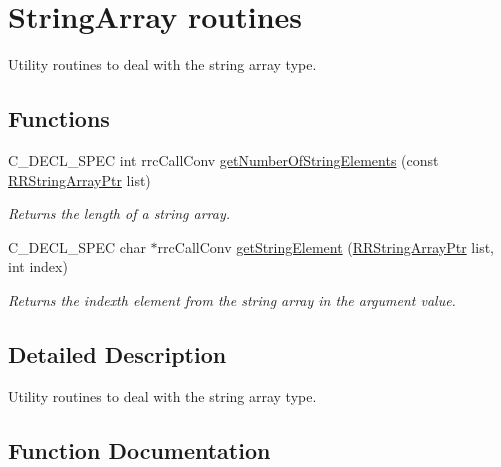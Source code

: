 \hypertarget{group__string_array}{}\section{String\+Array routines}
\label{group__string_array}


Utility routines to deal with the string array type.  


\subsection*{Functions}
\begin{DoxyCompactItemize}
\item 
C\+\_\+\+D\+E\+C\+L\+\_\+\+S\+P\+E\+C int rrc\+Call\+Conv \hyperlink{group__string_array_ga4fcdcd7af4041c61ad958b7444ed0263}{get\+Number\+Of\+String\+Elements} (const \hyperlink{rrc__types_8h_a7c9475df6c7337d99482b13a365e7596}{R\+R\+String\+Array\+Ptr} list)
\begin{DoxyCompactList}\small\item\em Returns the length of a string array. \end{DoxyCompactList}\item 
C\+\_\+\+D\+E\+C\+L\+\_\+\+S\+P\+E\+C char $\ast$rrc\+Call\+Conv \hyperlink{group__string_array_ga6543d536e989bd4cbf52b53e000cf025}{get\+String\+Element} (\hyperlink{rrc__types_8h_a7c9475df6c7337d99482b13a365e7596}{R\+R\+String\+Array\+Ptr} list, int index)
\begin{DoxyCompactList}\small\item\em Returns the indexth element from the string array in the argument value. \end{DoxyCompactList}\end{DoxyCompactItemize}


\subsection{Detailed Description}
Utility routines to deal with the string array type. 



\subsection{Function Documentation}
\hypertarget{group__string_array_ga4fcdcd7af4041c61ad958b7444ed0263}{}
